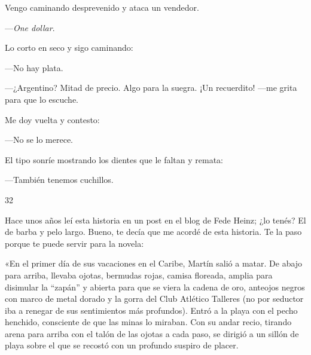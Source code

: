 \documentclass[12pt,twoside,openright,a5paper]{book}
\begin{document}
\nopagebreak

\vspace{0.5cm}

\nopagebreak

Vengo caminando desprevenido y ataca un vendedor.

---\emph{One dollar}.

Lo corto en seco y sigo caminando:

---No hay plata.

---¿Argentino? Mitad de precio. Algo para la suegra. ¡Un recuerdito! ---me grita
para que lo escuche.

Me doy vuelta y contesto:

---No se lo merece.

El tipo sonríe mostrando los dientes que le faltan y remata: 

---También tenemos cuchillos.

\vspace{0.5cm}

\hrulefill \hspace{0.1cm}\decofourleft\hspace{0.2cm} 32 \hspace{0.2cm}\decofourright \hspace{0.1cm}\hrulefill

\nopagebreak

\vspace{0.5cm}

\nopagebreak

Hace unos años leí esta historia en un post en el blog de Fede Heinz;
¿lo tenés? El de barba y pelo largo. Bueno, te decía que me acordé de
esta historia. Te la paso porque te puede servir para la novela:

«En el primer día de sus vacaciones en el Caribe, Martín salió a matar. De
abajo para arriba, llevaba ojotas, bermudas rojas, camisa floreada, amplia
para disimular la ``zapán'' y abierta para que se viera la cadena de oro,
anteojos negros con marco de metal dorado y la gorra del Club Atlético
Talleres (no por seductor iba a renegar de sus sentimientos más
profundos). Entró a la playa con el pecho henchido, consciente de que las
minas lo miraban. Con su andar recio, tirando arena para arriba con el
talón de las ojotas a cada paso, se dirigió a un sillón de playa sobre
el que se recostó con un profundo suspiro de placer.
\end{document}
